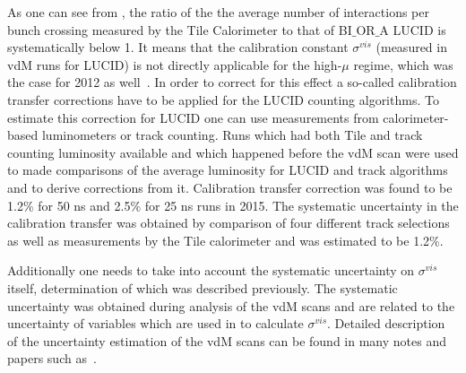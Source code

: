 As one can see from , the ratio of the the average number of \pp interactions per bunch crossing
measured by the Tile Calorimeter to that of BI$\_$OR$\_$A LUCID is systematically below 1. 
It means that the calibration constant $\sigma^{vis}$ (measured in vdM runs for LUCID) is not directly applicable for the high-$\mu$ regime, 
which was the case for 2012 as well~\cite{Aaboud:2016hhf}.
In order to correct for this effect a so-called calibration transfer corrections have to be applied for the LUCID counting algorithms.
To estimate this correction for LUCID one can use measurements from calorimeter-based luminometers or track counting.
Runs which had both Tile and track counting luminosity available and which happened before the vdM scan were used to made comparisons of the average luminosity for LUCID and track algorithms
and to derive corrections from it. Calibration transfer correction was found to be 1.2$\%$ for 50 ns and 2.5$\%$ for 25 ns runs in 2015.
The systematic uncertainty in the calibration transfer was obtained by comparison of four different track selections as well as measurements by the Tile calorimeter and was estimated to be 1.2$\%$.

Additionally one needs to take into account the systematic uncertainty on $\sigma^{vis}$ itself, determination of which was described previously.
The systematic uncertainty was obtained during analysis of the vdM scans and are related to the uncertainty of variables which are used in
 to calculate $\sigma^{vis}$. 
Detailed description of the uncertainty estimation of the vdM scans can be found in many notes and papers such 
as~\cite{ATLAS:2010uca,ATLAS-CONF-2011-011,ATLAS:2011cia,ATLAS:2012roa,Aad:2011dr,Aad:2013ucp,Aaboud:2016hhf}.

